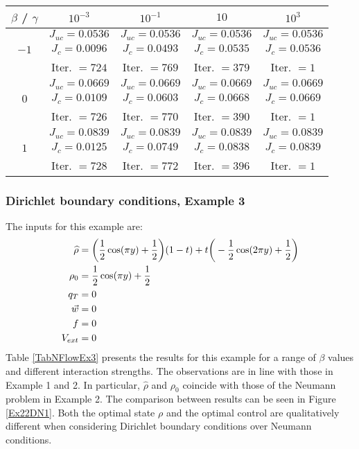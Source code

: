 \begin{table}
	\begin{tabular}{ ||c|| c | c |c | c ||}
		\hline
		$\beta$ / $\gamma$ & $10^{-3}$  & $10^{-1}$  & $10$ & $10^3$ \\ 
		\hline 
		& $J_{uc} = 0.0536$ & $J_{uc} = 0.0536$  & $J_{uc} = 0.0536$ & $J_{uc} = 0.0536$\\ 
		$-1$ & $J_c = 0.0096$ & $J_c = 0.0493$ & $J_c = 0.0535$ & $J_c = 0.0536$\\ 
		& Iter. $= 724$ & Iter. $= 769$  & Iter. $= 379$ & Iter. $= 1$\\ 
		\hline
		& $J_{uc} = 0.0669$ & $J_{uc} = 0.0669$   & $J_{uc} = 0.0669$& $J_{uc} = 0.0669$\\
		$0$  & $J_c = 0.0109$ & $J_c = 0.0603$  & $J_c = 0.0668$ & $J_c = 0.0669$\\ 
		& Iter. $= 726$ & Iter. $= 770$  & Iter. $= 390$ & Iter. $= 1$\\ 
		\hline
		& $J_{uc} = 0.0839$ & $J_{uc} = 0.0839$  & $J_{uc} = 0.0839$ & $J_{uc} = 0.0839$\\
		$1$  & $J_c = 0.0125$ & $J_c = 0.0749$  & $J_c = 0.0838$ & $J_c = 0.0839$\\ 
		& Iter. $= 728$ & Iter. $= 772$  & Iter. $= 396$ & Iter. $= 1$\\ 
		\hline 
	\end{tabular}
    \caption{}
    \label{TabNFlowEx2}
\end{table}

\subsubsection{Dirichlet boundary conditions, Example 3} 
The inputs for this example are:
\begin{align*}
\widehat \rho &= \bigg(\frac{1}{2}\cos(\pi y) + \frac{1}{2}\bigg)(1-t) + t\bigg(-\frac{1}{2}\cos(2 \pi y) + \frac{1}{2}\bigg)\\
\rho_{0} &= \frac{1}{2}\cos(\pi y) + \frac{1}{2}\\
q_{T} &= 0\\
\vec{w} &= 0\\
f &=0\\
V_{ext} &=0
\end{align*}
Table \ref{TabNFlowEx3} presents the results for this example for a range of $\beta$ values and different interaction strengths. The observations are in line with those in Example 1 and 2. In particular, $ \widehat \rho$ and $\rho_0$ coincide with those of the Neumann problem in Example 2. The comparison between results can be seen in Figure \ref{Ex22DN1}. Both the optimal state $\rho$ and the optimal control are qualitatively different when considering Dirichlet boundary conditions over Neumann conditions.


